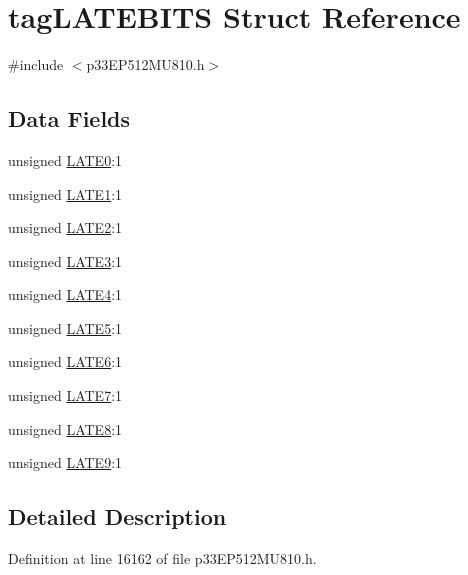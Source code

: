 \hypertarget{structtag_l_a_t_e_b_i_t_s}{}\section{tag\+L\+A\+T\+E\+B\+I\+TS Struct Reference}
\label{structtag_l_a_t_e_b_i_t_s}


{\ttfamily \#include $<$p33\+E\+P512\+M\+U810.\+h$>$}

\subsection*{Data Fields}
\begin{DoxyCompactItemize}
\item 
unsigned \hyperlink{structtag_l_a_t_e_b_i_t_s_a4136ff3de6a22d8ad71ba4b5c0773114}{L\+A\+T\+E0}\+:1
\item 
unsigned \hyperlink{structtag_l_a_t_e_b_i_t_s_aec27d2d6ea6ab19a25591d77f6e79876}{L\+A\+T\+E1}\+:1
\item 
unsigned \hyperlink{structtag_l_a_t_e_b_i_t_s_af21750f718f63a5901253e3731017a23}{L\+A\+T\+E2}\+:1
\item 
unsigned \hyperlink{structtag_l_a_t_e_b_i_t_s_a50e6d9d0e75d2f82c93dcae82fb0d8e5}{L\+A\+T\+E3}\+:1
\item 
unsigned \hyperlink{structtag_l_a_t_e_b_i_t_s_a731fc0a3173e6d92a47eaa8d2f53698d}{L\+A\+T\+E4}\+:1
\item 
unsigned \hyperlink{structtag_l_a_t_e_b_i_t_s_add4133c85a47efaab31f44e62fe778e6}{L\+A\+T\+E5}\+:1
\item 
unsigned \hyperlink{structtag_l_a_t_e_b_i_t_s_a17952541fda6d414bc43a629dba6b00c}{L\+A\+T\+E6}\+:1
\item 
unsigned \hyperlink{structtag_l_a_t_e_b_i_t_s_a4c9c6d0804a71546ff46c40bf7fa5e54}{L\+A\+T\+E7}\+:1
\item 
unsigned \hyperlink{structtag_l_a_t_e_b_i_t_s_a676d0ef2b67084d4dc0d7b95a1421481}{L\+A\+T\+E8}\+:1
\item 
unsigned \hyperlink{structtag_l_a_t_e_b_i_t_s_a1bd8054b3dba2bd2cea2de7e59e41d75}{L\+A\+T\+E9}\+:1
\end{DoxyCompactItemize}


\subsection{Detailed Description}


Definition at line 16162 of file p33\+E\+P512\+M\+U810.\+h.




